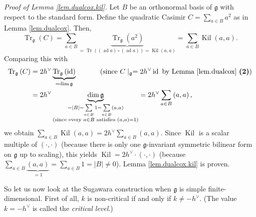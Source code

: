 \documentclass[etingof-lie.tex]{subfiles}
\begin{document}
\textit{Proof of Lemma \ref{lem.dualcox.kil}.} Let $B$ be an orthonormal basis
of $\mathfrak{g}$ with respect to the standard form. Define the quadratic
Casimir $C=\sum\limits_{a\in B}a^{2}$ as in Lemma \ref{lem.dualcox}. Then,%
\[
\operatorname*{Tr}\nolimits_{\mathfrak{g}}\left(  C\right)  =\sum\limits_{a\in
B}\underbrace{\operatorname*{Tr}\nolimits_{\mathfrak{g}}\left(  a^{2}\right)
}_{=\operatorname*{Tr}\left(  \left(  \operatorname*{ad}a\right)  \circ\left(
\operatorname*{ad}a\right)  \right)  =\operatorname*{Kil}\left(  a,a\right)
}=\sum\limits_{a\in B}\operatorname*{Kil}\left(  a,a\right)  .
\]
Comparing this with%
\begin{align*}
\operatorname*{Tr}\nolimits_{\mathfrak{g}}\left(  C\right)   &  =2h^{\vee
}\underbrace{\operatorname*{Tr}\nolimits_{\mathfrak{g}}\left(
\operatorname*{id}\right)  }_{=\dim\mathfrak{g}}\ \ \ \ \ \ \ \ \ \ \left(
\text{since }C\mid_{\mathfrak{g}}=2h^{\vee}\operatorname*{id}\text{ by Lemma
\ref{lem.dualcox} \textbf{(2)}}\right) \\
&  =2h^{\vee}\underbrace{\dim\mathfrak{g}}_{\substack{=\left\vert B\right\vert
=\sum\limits_{a\in B}1=\sum\limits_{a\in B}\left(  a,a\right)  \\\text{(since
every }a\in B\text{ satisfies }\left(  a,a\right)  =1\text{)}}}=2h^{\vee}%
\sum\limits_{a\in B}\left(  a,a\right)  ,
\end{align*}
we obtain $\sum\limits_{a\in B}\operatorname*{Kil}\left(  a,a\right)
=2h^{\vee}\sum\limits_{a\in B}\left(  a,a\right)  $. Since
$\operatorname*{Kil}$ is a scalar multiple of $\left(  \cdot,\cdot\right)  $
(because there is only one $\mathfrak{g}$-invariant symmetric bilinear form on
$\mathfrak{g}$ up to scaling), this yields $\operatorname*{Kil}=2h^{\vee}%
\cdot\left(  \cdot,\cdot\right)  $ (because $\sum\limits_{a\in B}%
\underbrace{\left(  a,a\right)  }_{=1}=\sum\limits_{a\in B}1=\left\vert
B\right\vert \neq0$). Lemma \ref{lem.dualcox.kil} is proven.

So let us now look at the Sugawara construction when $\mathfrak{g}$ is simple
finite-dimensional. First of all, $k$ is non-critical if and only if
$k\neq-h^{\vee}$. (The value $k=-h^{\vee}$ is called the \textit{critical
level}.)
\end{document}
